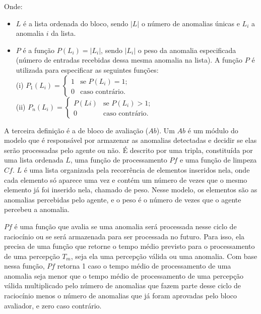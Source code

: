 \begin{definition}
\begin{itemize}
            Onde:
            
            \begin{itemize}
                \item $L$ é a lista ordenada do bloco, sendo $|L|$ o número de anomalias únicas e $L_{i}$ a anomalia $i$ da lista.
                \item $P$ é a função $P(L_{i}) = |L_{i}|$, sendo $|L_{i}|$ o peso da anomalia especificada (número de entradas recebidas dessa mesma anomalia na lista). A função $P$ é utilizada para especificar as seguintes funções:
                \\
                
                    (i) $ P_{1}(L_{i}) = \left\{ \begin{array}{ll}
                        1 & \mbox{se $P(L_{i}) = 1$;}\\
                        0 & \mbox{caso contrário}.\end{array} \right. $
                \\
                
                    (ii) $ P_{n}(L_{i}) = \left\{ \begin{array}{ll}
                        P(L{i}) & \mbox{se $P(L_{i}) > 1$;}\\
                        0 & \mbox{caso contrário}.\end{array} \right. $
            \end{itemize}{}
    \end{itemize}
\end{definition}{}

A terceira definição é a de bloco de avaliação ($Ab$). Um $Ab$ é um módulo do modelo que é responsável por armazenar as anomalias detectadas e decidir se elas serão processadas pelo agente ou não. É descrito por uma tripla, constituída por uma lista ordenada $L$, uma função de processamento $Pf$ e uma função de limpeza $Cf$. $L$ é uma lista organizada pela recorrência de elementos inseridos nela, onde cada elemento só aparece uma vez e contém um número de vezes que o mesmo elemento já foi inserido nela, chamado de peso. Nesse modelo, os elementos são as anomalias percebidas pelo agente, e o peso é o número de vezes que o agente percebeu a anomalia.

$Pf$ é uma função que avalia se uma anomalia será processada nesse ciclo de raciocínio ou se será armazenada para ser processada no futuro. Para isso, ela precisa de uma função que retorne o tempo médio previsto para o processamento de uma percepção $T_m$, seja ela uma percepção válida ou uma anomalia. Com base nessa função, $Pf$ retorna 1 caso o tempo médio de processamento de uma anomalia seja menor que o tempo médio de processamento de uma percepção válida multiplicado pelo número de anomalias que fazem parte desse ciclo de raciocínio menos o número de anomalias que já foram aprovadas pelo bloco avaliador, e zero caso contrário.

